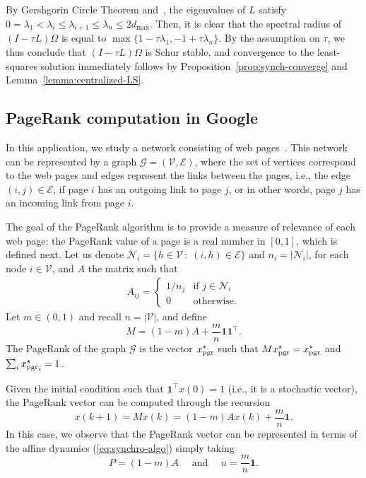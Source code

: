 \documentclass{IEEEtran}
\newcommand{\subscr}[2]{#1_{\textup{#2}}}
\newcommand{\setdef}[2]{\{#1 \, : \; #2\}}
\newcommand{\G}{\mathcal{G}} \newcommand{\V}{\mathcal{V}} \newcommand{\E}{\mathcal{E}}
\newcommand{\neigh}{ \mathcal{N}} 	\newcommand{\card}[1]{|#1|}
\newcommand{\pgr}{{\subscr{x}{pgr}^{\star}}} \newcommand{\loc}{{\subscr{x}{loc}^{\star}}} \newcommand{\op}{{\subscr{x}{opd}^{\star}}}
\newcommand{\1}{\mathbf{1}} \newcommand{\ind}{\mathds{1}}
\begin{document}
\begin{IEEEproof}
By Gershgorin Circle Theorem and~\cite[Theorem~1.37]{FB-JC-SM:09}, the eigenvalues of $L$ satisfy $0=\lambda_1<\lambda_i\le\lambda_{i+1}\le \lambda_n\le 2{d}_{\max}$. 
Then, it is clear that the spectral radius of $(I-\tau L)\Omega$ is equal to $\max\{1-\tau \lambda_1,-1+\tau\lambda_{n}\}$. 
By the assumption on $\tau$, we thus conclude that $(I-\tau L)\Omega$ is Schur stable, and convergence to the least-squares solution immediately follows by Proposition~\ref{prop:synch-converge} and Lemma~\ref{lemma:centralized-LS}.
\end{IEEEproof}


\subsection{PageRank computation in Google}

In this application, we study a network consisting of web pages~\cite{SB-LP:98}. This network can be represented by a graph $ {\G}=( {\V}, {\E})$, where the set of vertices correspond to the web pages and edges represent the links between the pages, i.e., the edge $(i,j)\in\mathcal{E}$, if page $i$ has an outgoing link to page $j$, or in other words, page $j$ has
an incoming link from page $i$. 

The goal of the PageRank algorithm is to provide a measure of relevance of each web page: the PageRank value of a page is a real number in $[0, 1]$, which is defined next.
Let us denote $\neigh_i=\setdef{h\in \V}{(i,h)\in \E}$ and $n_i=\card{\neigh_i}$, for each node $ i\in \V$, and $A$ the matrix such that 
\begin{align*}
A_{ij}=\begin{cases}
1/{n_j}&\text{if }j\in \neigh_i\\
0&\text{otherwise}. 
\end{cases}
\end{align*}
Let $m\in (0,1)$ and recall $n=\card{\V}$, and define 
\begin{equation}
M=(1-m) A+ \frac{m}n \1\1^{\top}.	
\end{equation} 
The PageRank of the graph $\G$ is the vector $\pgr$ such that $M\pgr=\pgr$ and $\sum_i\pgr_i=1$.

Given the initial condition such that $\1^{\top} x(0)=1$ (i.e., it is a stochastic vector), the PageRank vector can be computed through the recursion
\begin{equation}\label{eq:pow_meth}
x(k+1)=Mx(k)=(1-m)Ax(k)+\frac{m}{n}\1.
\end{equation}
In this case, we observe that the PageRank vector can be represented in terms of the affine dynamics (\ref{eq:synchro-algo})
simply taking 
\begin{equation}\label{Pu-def-pagerank}P=(1-m)A\quad\text{ and } \quad u=\frac{m}{n}\1.\end{equation}
\end{document}
